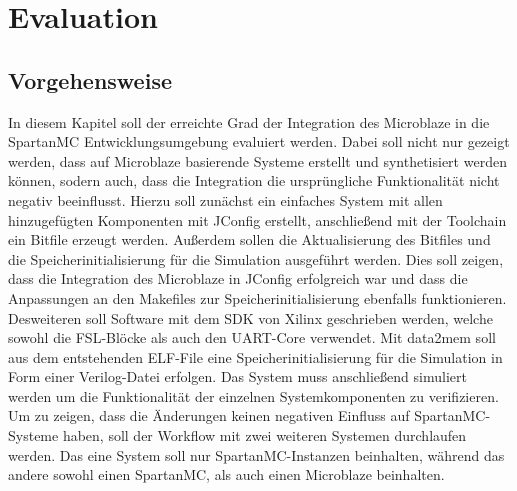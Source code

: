 \chapter{Evaluation}
\section{Vorgehensweise}
In diesem Kapitel soll der erreichte Grad der Integration des Microblaze in die SpartanMC Entwicklungsumgebung evaluiert werden. Dabei soll nicht nur gezeigt werden, dass auf Microblaze basierende Systeme erstellt und synthetisiert werden können, sodern auch, dass die Integration die ursprüngliche Funktionalität nicht negativ beeinflusst. Hierzu soll zunächst ein einfaches System mit allen hinzugefügten Komponenten mit JConfig erstellt, anschließend mit der Toolchain ein Bitfile erzeugt werden. Außerdem sollen die Aktualisierung des Bitfiles und die Speicherinitialisierung für die Simulation ausgeführt werden. Dies soll zeigen, dass die Integration des Microblaze in JConfig erfolgreich war und dass die Anpassungen an den Makefiles zur Speicherinitialisierung ebenfalls funktionieren.\\
Desweiteren soll Software mit dem SDK von Xilinx geschrieben werden, welche sowohl die FSL-Blöcke als auch den UART-Core verwendet. Mit data2mem soll aus dem entstehenden ELF-File eine Speicherinitialisierung für die Simulation in Form einer Verilog-Datei erfolgen. Das System muss anschließend simuliert werden um die Funktionalität der einzelnen Systemkomponenten zu verifizieren.\\
Um zu zeigen, dass die Änderungen keinen negativen Einfluss auf SpartanMC-Systeme haben, soll der Workflow mit zwei weiteren Systemen durchlaufen werden. Das eine System soll nur SpartanMC-Instanzen beinhalten, während das andere sowohl einen SpartanMC, als auch einen Microblaze beinhalten.
